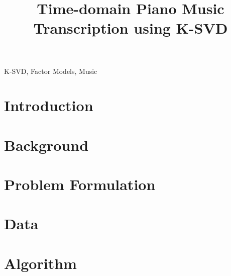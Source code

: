 \documentclass{article}
\title{Time-domain Piano Music Transcription using K-SVD}
\begin{document}
%

\maketitle
%
\begin{abstract}

\end{abstract}
%
\begin{keywords}
K-SVD, Factor Models, Music
\end{keywords}
%
\section{Introduction}
\label{sec:intro}


\section{Background}%
\label{sec:background}


\section{Problem Formulation}%
\label{sec:problem_formulation}


\section{Data}%
\label{sec:data}



\section{Algorithm}%
\label{sec:algorithm}










\end{document}
